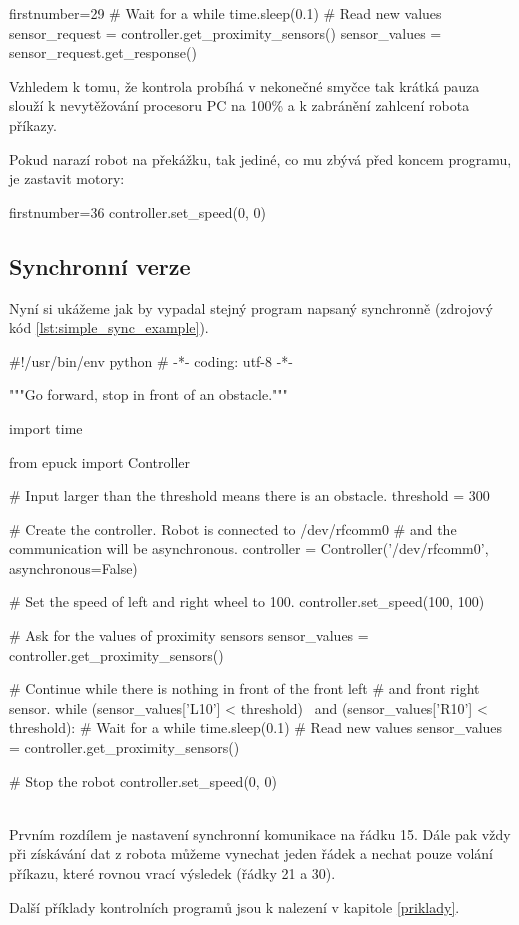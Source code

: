    \begin{pyc*}{firstnumber=29}
    # Wait for a while
    time.sleep(0.1)
    # Read new values
    sensor_request = controller.get_proximity_sensors()
    sensor_values = sensor_request.get_response()
    \end{pyc*}

    Vzhledem k tomu, že kontrola probíhá v nekonečné smyčce tak krátká pauza
    slouží k nevytěžování procesoru PC na 100\% a k zabránění zahlcení robota
    příkazy.

    Pokud narazí robot na překážku, tak jediné, co mu zbývá před koncem
    programu, je zastavit motory:

    \begin{pyc*}{firstnumber=36}
    controller.set_speed(0, 0)
    \end{pyc*}

    \subsection{Synchronní verze}

    Nyní si ukážeme jak by vypadal stejný program napsaný synchronně (zdrojový
    kód \ref{lst:simple_sync_example}).

    \begin{mylisting}
    \begin{pyc}
#!/usr/bin/env python
# -*- coding: utf-8 -*-

"""Go forward, stop in front of an obstacle."""

import time

from epuck import Controller

# Input larger than the threshold means there is an obstacle.
threshold = 300

# Create the controller. Robot is connected to /dev/rfcomm0
# and the communication will be asynchronous.
controller = Controller('/dev/rfcomm0', asynchronous=False)

# Set the speed of left and right wheel to 100.
controller.set_speed(100, 100)

# Ask for the values of proximity sensors
sensor_values = controller.get_proximity_sensors()

# Continue while there is nothing in front of the front left
# and front right sensor.
while (sensor_values['L10'] < threshold) \
    and (sensor_values['R10'] < threshold):
    # Wait for a while
    time.sleep(0.1)
    # Read new values
    sensor_values = controller.get_proximity_sensors()

# Stop the robot
controller.set_speed(0, 0)
\end{pyc}
\label{lst:simple_sync_example}
\end{mylisting}
\hfill\\

Prvním rozdílem je nastavení synchronní komunikace na řádku 15. Dále pak vždy
při získávání dat z robota můžeme vynechat jeden řádek a nechat pouze volání
příkazu, které rovnou vrací výsledek (řádky 21 a 30).

Další příklady kontrolních programů jsou k nalezení v kapitole \ref{priklady}.
